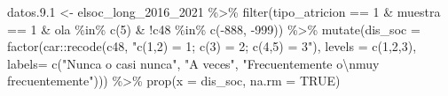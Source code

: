 \documentclass[
  12pt,
]{book}
\newenvironment{Shaded}{\begin{snugshade}}{\end{snugshade}}
\newcommand{\AttributeTok}[1]{\textcolor[rgb]{0.77,0.63,0.00}{#1}}
\newcommand{\ConstantTok}[1]{\textcolor[rgb]{0.00,0.00,0.00}{#1}}
\newcommand{\DecValTok}[1]{\textcolor[rgb]{0.00,0.00,0.81}{#1}}
\newcommand{\FloatTok}[1]{\textcolor[rgb]{0.00,0.00,0.81}{#1}}
\newcommand{\FunctionTok}[1]{\textcolor[rgb]{0.00,0.00,0.00}{#1}}
\newcommand{\NormalTok}[1]{#1}
\newcommand{\OtherTok}[1]{\textcolor[rgb]{0.56,0.35,0.01}{#1}}
\newcommand{\SpecialCharTok}[1]{\textcolor[rgb]{0.00,0.00,0.00}{#1}}
\newcommand{\StringTok}[1]{\textcolor[rgb]{0.31,0.60,0.02}{#1}}
\begin{document}
\begin{Shaded}
\begin{Highlighting}[]
\NormalTok{datos.}\FloatTok{9.1} \OtherTok{\textless{}{-}}\NormalTok{ elsoc\_long\_2016\_2021 }\SpecialCharTok{\%\textgreater{}\%} 
  \FunctionTok{filter}\NormalTok{(tipo\_atricion }\SpecialCharTok{==} \DecValTok{1} \SpecialCharTok{\&}\NormalTok{ muestra }\SpecialCharTok{==} \DecValTok{1} \SpecialCharTok{\&}\NormalTok{ ola }\SpecialCharTok{\%in\%} \FunctionTok{c}\NormalTok{(}\DecValTok{5}\NormalTok{) }\SpecialCharTok{\&} \SpecialCharTok{!}\NormalTok{c48 }\SpecialCharTok{\%in\%} \FunctionTok{c}\NormalTok{(}\SpecialCharTok{{-}}\DecValTok{888}\NormalTok{, }\SpecialCharTok{{-}}\DecValTok{999}\NormalTok{)) }\SpecialCharTok{\%\textgreater{}\%} 
  \FunctionTok{mutate}\NormalTok{(}\AttributeTok{dis\_soc =} \FunctionTok{factor}\NormalTok{(car}\SpecialCharTok{::}\FunctionTok{recode}\NormalTok{(c48, }\StringTok{"c(1,2) = 1; c(3) = 2; c(4,5) = 3"}\NormalTok{),}
                               \AttributeTok{levels =} \FunctionTok{c}\NormalTok{(}\DecValTok{1}\NormalTok{,}\DecValTok{2}\NormalTok{,}\DecValTok{3}\NormalTok{),}
                               \AttributeTok{labels=} \FunctionTok{c}\NormalTok{(}\StringTok{"Nunca o casi nunca"}\NormalTok{, }\StringTok{"A veces"}\NormalTok{,}
                                         \StringTok{"Frecuentemente o}\SpecialCharTok{\textbackslash{}n}\StringTok{muy frecuentemente"}\NormalTok{))) }\SpecialCharTok{\%\textgreater{}\%}
  \FunctionTok{prop}\NormalTok{(}\AttributeTok{x =}\NormalTok{ dis\_soc, }\AttributeTok{na.rm =} \ConstantTok{TRUE}\NormalTok{)}


\end{Highlighting}
\end{Shaded}
\end{document}
